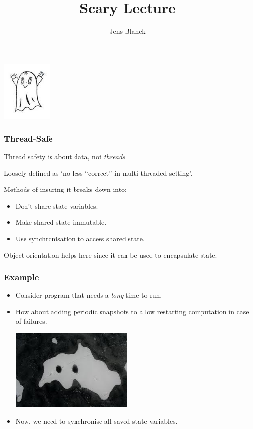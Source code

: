 \documentclass[notheorems]{beamer}%
\title%
{Scary Lecture}
\author%
{Jens Blanck}
\institute%
{%
   Swansea University
}
\date%
{}
\theoremstyle{definition}
\begin{document}
\begin{frame}
  \titlepage
  \includegraphics[height=3cm]{spok.jpg}
\end{frame}

\begin{frame}
  \frametitle{Thread-Safe}
  Thread safety is about \alert{data}, not \emph{threads}.

  Loosely defined as `no less ``correct'' in multi-threaded setting'.

  Methods of insuring it breaks down into:
  \begin{itemize}
  \item \alert{Don't share} state variables.
  \item Make shared state \alert{immutable}.
  \item Use \alert{synchronisation} to access shared state.
  \end{itemize}

  Object orientation helps here since it can be used to encapsulate
  state. 
\end{frame}

\begin{frame}
  \frametitle{Example}
  \begin{itemize}
  \item Consider program that needs a \emph{long} time to run.
  \item How about adding periodic snapshots to allow restarting computation in
    case of failures.
  \begin{center}
    \includegraphics[height=4cm]{images.jpg}
  \end{center}
  \item Now, we need to synchronise all saved state variables.
  \end{itemize}
\end{frame}
\end{document}
